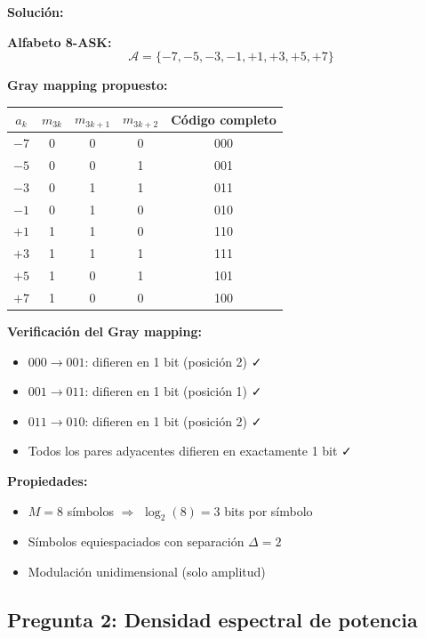 \documentclass[11pt,a4paper]{article}
\begin{document}
\vspace{0.3cm}
\textbf{Soluci\'on:}

\textbf{Alfabeto 8-ASK:}
\[
\boxed{\mathcal{A} = \{-7, -5, -3, -1, +1, +3, +5, +7\}}
\]

\textbf{Gray mapping propuesto:}

\begin{center}
\begin{tabular}{|c|c|c|c|c|}
\hline
\textbf{$a_k$} & \textbf{$m_{3k}$} & \textbf{$m_{3k+1}$} & \textbf{$m_{3k+2}$} & \textbf{C\'odigo completo} \\
\hline
$-7$ & 0 & 0 & 0 & 000 \\
$-5$ & 0 & 0 & 1 & 001 \\
$-3$ & 0 & 1 & 1 & 011 \\
$-1$ & 0 & 1 & 0 & 010 \\
$+1$ & 1 & 1 & 0 & 110 \\
$+3$ & 1 & 1 & 1 & 111 \\
$+5$ & 1 & 0 & 1 & 101 \\
$+7$ & 1 & 0 & 0 & 100 \\
\hline
\end{tabular}
\end{center}

\textbf{Verificaci\'on del Gray mapping:}
\begin{itemize}
    \item $000 \rightarrow 001$: difieren en 1 bit (posici\'on 2) ✓
    \item $001 \rightarrow 011$: difieren en 1 bit (posici\'on 1) ✓
    \item $011 \rightarrow 010$: difieren en 1 bit (posici\'on 2) ✓
    \item Todos los pares adyacentes difieren en exactamente 1 bit ✓
\end{itemize}

\textbf{Propiedades:}
\begin{itemize}
    \item $M = 8$ s\'imbolos $\Rightarrow$ $\log_2(8) = 3$ bits por s\'imbolo
    \item S\'imbolos equiespaciados con separaci\'on $\Delta = 2$
    \item Modulaci\'on unidimensional (solo amplitud)
\end{itemize}



\subsection*{Pregunta 2: Densidad espectral de potencia}
\end{document}
